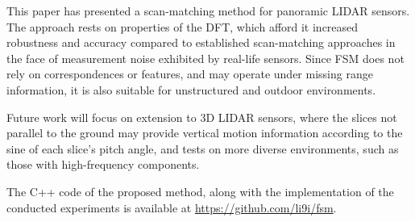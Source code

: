 This paper has presented a scan-matching method for panoramic LIDAR sensors.
The approach rests on properties of the DFT, which afford it increased
robustness and accuracy compared to established scan-matching approaches in the
face of measurement noise exhibited by real-life sensors. Since FSM does not
rely on correspondences or features, and may operate under missing range
information, it is also suitable for unstructured and outdoor environments.

Future work will focus on extension to 3D LIDAR sensors, where the slices not
parallel to the ground may provide vertical motion information according to
the sine of each slice's pitch angle, and tests on more diverse environments,
such as those with high-frequency components.

The C++ code of the
proposed method, along with the implementation of the conducted experiments is
available at \url{https://github.com/li9i/fsm}.
